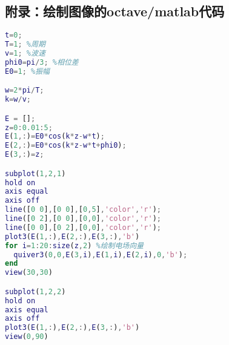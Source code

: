\subsection{附录：绘制图像的octave/matlab代码}
\begin{lstlisting}[language=matlab]
t=0; 
T=1; %周期
v=1; %波速
phi0=pi/3; %相位差
E0=1; %振幅

w=2*pi/T;
k=w/v;

E = [];
z=0:0.01:5;
E(1,:)=E0*cos(k*z-w*t);
E(2,:)=E0*cos(k*z-w*t+phi0);
E(3,:)=z;

subplot(1,2,1)
hold on
axis equal
axis off
line([0 0],[0 0],[0,5],'color','r');
line([0 2],[0 0],[0,0],'color','r');
line([0 0],[0 2],[0,0],'color','r');
plot3(E(1,:),E(2,:),E(3,:),'b')
for i=1:20:size(z,2) %绘制电场向量
  quiver3(0,0,E(3,i),E(1,i),E(2,i),0,'b');
end
view(30,30)

subplot(1,2,2)
hold on
axis equal
axis off
plot3(E(1,:),E(2,:),E(3,:),'b')
view(0,90)

\end{lstlisting}
